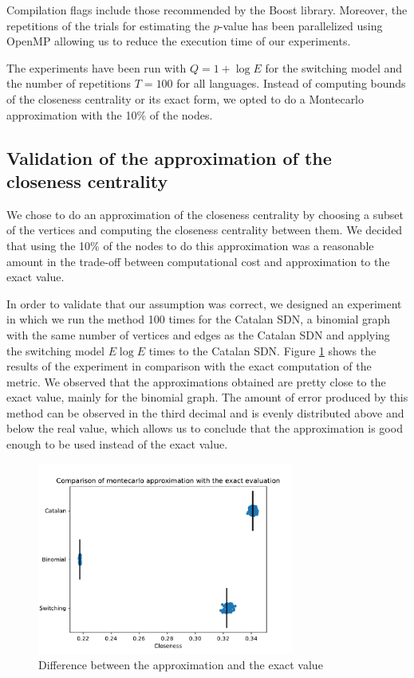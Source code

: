 Compilation flags include those recommended by the Boost library. Moreover, the repetitions of the trials for estimating the $p$-value has been parallelized using OpenMP allowing us to reduce the execution time of our experiments.

The experiments have been run with $Q = 1 +\log E$ for the switching model and the number of repetitions $T=100$ for all languages. Instead of computing bounds of the closeness centrality or its exact form, we opted to do a Montecarlo approximation with the 10\% of the nodes.

\subsection{Validation of the approximation of the closeness centrality \label{sub:validation}}
We chose to do an approximation of the closeness centrality by choosing a subset of the vertices and computing the closeness centrality between them. We decided that using the 10\% of the nodes to do this approximation was a reasonable amount in the trade-off between computational cost and approximation to the exact value.

In order to validate that our assumption was correct, we designed an experiment in which we run the method 100 times for the Catalan SDN, a binomial graph with the same number of vertices and edges as the Catalan SDN and applying the switching model $E \log E$ times to the Catalan SDN. Figure \ref{fig:validation} shows the results of the experiment in comparison with the exact computation of the metric. We observed that the approximations obtained are pretty close to the exact value, mainly for the binomial graph. The amount of error produced by this method can be observed in the third decimal and is evenly distributed above and below the real value, which allows us to conclude that the approximation is good enough to be used instead of the exact value.

\begin{figure}[!htb]
    \centering
    \includegraphics[width=0.75\textwidth]{figures/closeness_validation.pdf}
    \caption{Difference between the approximation and the exact value}
    \label{fig:validation}
\end{figure}